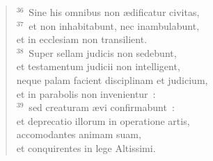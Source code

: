 \begin{verse}
${}^{36}$~Sine his omnibus non \ae dificatur civitas,\\
${}^{37}$~et non inhabitabunt, nec inambulabunt,\\ et in ecclesiam non transilient.\\
${}^{38}$~Super sellam judicis non sedebunt,\\ et testamentum judicii non intelligent,\\ neque palam facient disciplinam et judicium,\\ et in parabolis non invenientur~:\\
${}^{39}$~sed creaturam \ae vi confirmabunt~:\\ et deprecatio illorum in operatione artis,\\ accomodantes animam suam,\\ et conquirentes in lege Altissimi.\end{verse}



